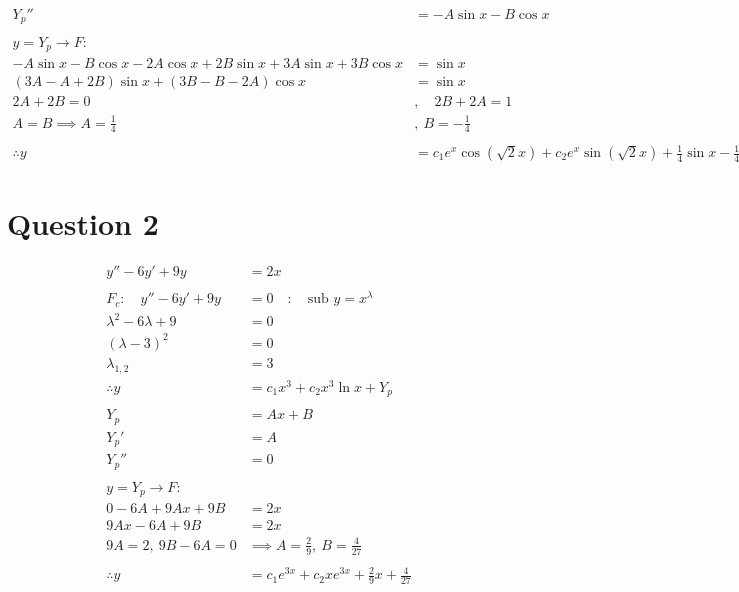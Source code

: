 \documentclass{article}
\begin{document}
\begin{align*}
    Y_p''                             & = -A\sin x-B\cos x                                                               \\
    \\
    y                         =Y_p\to F:
    \\-A\sin x-B\cos x-2A\cos x+2B\sin x+3A\sin x+3B\cos x & =\sin x                                          \\
    (3A-A+2B)\sin x + (3B-B-2A)\cos x & =\sin x                                                                          \\
    2A+2B=0\quad                      & ,\quad2B+2A=1                                                                    \\
    A = B \implies A = \frac{1}{4}    & ,\ B = -\frac{1}{4}                                                              \\
    \\
    \therefore y                      & =c_1e^x\cos(\sqrt{2}x)+c_2e^x\sin(\sqrt{2}x)+\frac{1}{4}\sin x-\frac{1}{4}\cos x
\end{align*}
\section*{Question 2}
\begin{align*}
    y''-6y'+9y           & =2x                                             \\
    \\
    F_c:\quad y''-6y'+9y & =0\quad:\quad\text{sub }y=x^\lambda             \\
    \lambda^2-6\lambda+9 & =0                                              \\
    (\lambda-3)^2        & =0                                              \\
    \lambda_{1,2}        & =3                                              \\
    \therefore y         & =c_1x^3+c_2x^3\ln x+Y_p                         \\
    \\
    Y_p                  & =Ax+B                                           \\
    Y_p'                 & =A                                              \\
    Y_p''                & =0                                              \\
    \\
    y=Y_p\to F:                                                            \\
    0-6A+9Ax+9B          & =2x                                             \\
    9Ax-6A+9B            & =2x                                             \\
    9A=2,\ 9B-6A=0       & \implies A=\frac{2}{9},\ B=\frac{4}{27}         \\
    \\
    \therefore y         & =c_1e^{3x}+c_2xe^{3x}+\frac{2}{9}x+\frac{4}{27}
\end{align*}
\end{document}
